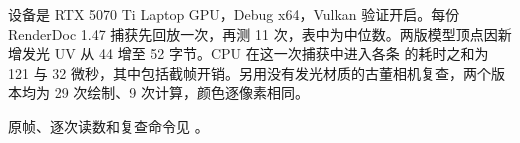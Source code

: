 设备是 RTX 5070 Ti Laptop GPU，Debug x64，Vulkan 验证开启。每份 RenderDoc 1.47 捕获先回放一次，再测 11 次，表中为中位数。两版模型顶点因新增发光 UV 从 44 增至 52 字节。CPU 在这一次捕获中进入各条  的耗时之和为 121 与 32 微秒，其中包括截帧开销。另用没有发光材质的古董相机复查，两个版本均为 29 次绘制、9 次计算，颜色逐像素相同。

{\small\color{Muted}原帧、逐次读数和复查命令见 。\par}
